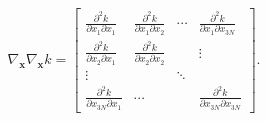 \begin{equation}
    \label{equ:2.40}
    \nabla_{\mathbf{x}}\nabla_{\mathbf{x}} k
    =
    \begin{bmatrix}
            \frac{\partial^{2} k}{\partial x_{1}\partial x_{1}} & \frac{\partial^{2} k}{\partial x_{1}\partial x_{2}}& \cdots&\frac{\partial^{2} k}{\partial x_{1}\partial x_{3N}} \\
            \frac{\partial^{2} k}{\partial x_{2}\partial x_{1}} & \frac{\partial^{2} k}{\partial x_{2}\partial x_{2}}& &  \vdots\\
            \vdots &  & \ddots & \\
            \frac{\partial^{2} k}{\partial x_{3N}\partial x_{1}}& \cdots &  &  \frac{\partial^{2} k}{\partial x_{3N}\partial x_{3N}}
        \end{bmatrix}.
\end{equation}

